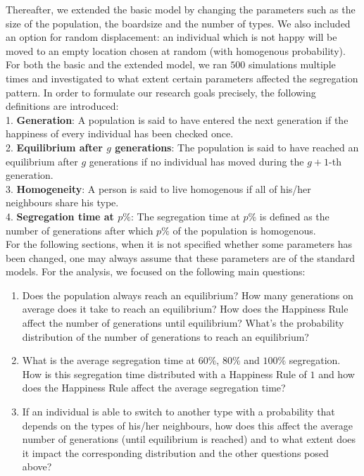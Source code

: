 Thereafter, we extended the basic model by changing the parameters such as the size of the population, the boardsize and the number of types. 
We also included an option for random displacement: an individual which is not happy will be moved to an empty location chosen at random (with homogenous probability).\\

For both the basic and the extended model, we ran $500$ simulations multiple times and investigated to what extent certain parameters affected the segregation pattern. 
In order to formulate our research goals precisely, the following definitions are introduced:\\
1. \textbf{Generation}: 
A population is said to have entered the next generation if the happiness of every individual has been checked once. \\
2. \textbf{Equilibrium after \(g\) generations}: 
The population is said to have reached an equilibrium after \(g\) generations if no individual has moved during the \(g+1\)-th generation.\\
3. \textbf{Homogeneity}:
A person is said to live homogenous if all of his/her neighbours share his type.\\
4. \textbf{Segregation time at $p\%$}: 
The segregation time at $p\%$ is defined as the number of generations after which $p\%$ of the population is homogenous.\\

For the following sections, when it is not specified whether some parameters has been changed, one may always assume that these parameters are of the standard models.
\newpage
For the analysis, we focused on the following main questions:
\begin{enumerate}
	\item 	Does the population always reach an equilibrium? 
	How many generations on average does it take to reach an equilibrium? 
	How does the Happiness Rule affect the number of generations until equilibrium? 
	What's the probability distribution of the number of generations to reach an equilibrium?

	\item What is the average segregation time at \(60\%\), \(80\%\) and \(100\%\) segregation. 
	How is this segregation time distributed with a Happiness Rule of \(1\) and how does the Happiness Rule affect the average segregation time?
	
	\item If an individual is able to switch to another type with a probability that depends on the types of his/her neighbours,
	how does this affect the average number of generations (until equilibrium is reached) and to what extent does it impact the corresponding distribution and the other questions posed above?
\end{enumerate}

